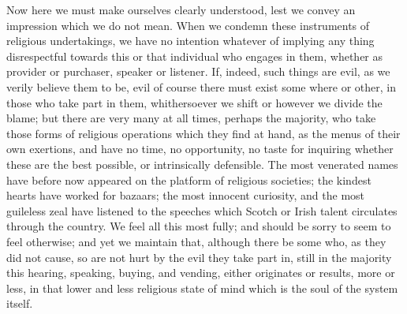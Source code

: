 Now here we
must make ourselves clearly understood, lest we convey an impression
which we do not mean. When we condemn these instruments of religious
undertakings, we have no intention whatever of implying any thing
disrespectful towards this or that individual who engages in them,
whether as provider or purchaser, speaker or listener. If, indeed, such
things are evil, as we verily believe them to be, evil of course there
must exist some where or other, in those who take part in them,
whithersoever we shift or however we divide the blame; but there are
very many at all times, perhaps the majority, who take those forms of
religious operations which they find at hand, as the menus of their own
exertions, and have no time, no opportunity, no taste for inquiring
whether these are the best possible, or intrinsically defensible. The
most venerated names have before now appeared on the platform of
religious societies; the kindest hearts have worked for bazaars; the
most innocent curiosity, and the most guileless zeal have listened to
the speeches which Scotch or Irish talent circulates through the
country. We feel all this most fully; and should be sorry to seem
to feel otherwise; and yet we maintain that, although there be some who,
as they did not cause, so are not hurt by the evil they take part in,
still in the majority this hearing, speaking, buying, and vending,
either originates or results, more or less, in that lower and less
religious state of mind which is the soul of the system itself.

